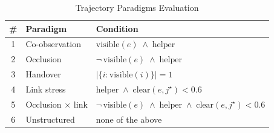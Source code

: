 \begin{table}[t]
\centering
\caption{Trajectory Paradigms Evaluation}
\label{tab:paradigms}
\footnotesize
\setlength{\tabcolsep}{4pt}
\begin{tabular}{@{}cll@{}}
\toprule
\# & Paradigm & Condition \\
\midrule
1 & Co-observation     & $\mathrm{visible}(e) \;\wedge\; \text{helper}$ \\
2 & Occlusion          & $\neg\,\mathrm{visible}(e) \;\wedge\; \text{helper}$ \\
3 & Handover          & $\lvert \{ i : \mathrm{visible}(i) \} \rvert = 1$ \\
4 & Link stress             & $\text{helper} \;\wedge\; \mathrm{clear}(e,j^\star) < 0.6$ \\
5 & Occlusion $\times$ link & $\neg\,\mathrm{visible}(e) \;\wedge\; \text{helper} \;\wedge\; \mathrm{clear}(e,j^\star) < 0.6$ \\
6 & Unstructured       & none of the above \\
\bottomrule
\end{tabular}
\end{table}
